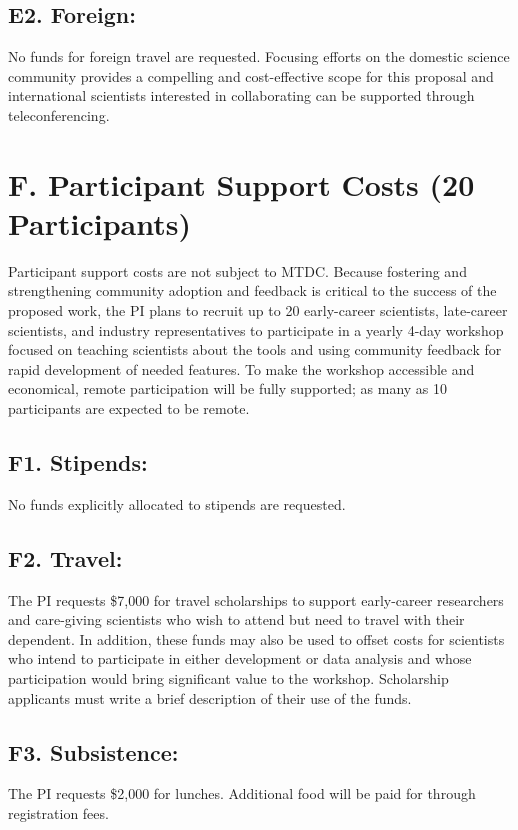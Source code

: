 \documentclass[11pt,oneside]{memoir}
\begin{document}
\subsection{E2. Foreign:}
No funds for foreign travel are requested.  Focusing efforts on the domestic science community provides a compelling and cost-effective scope for this proposal and international scientists interested in collaborating can be supported through teleconferencing.


\section*{F. Participant Support Costs (20 Participants)} 
Participant support costs are not subject to MTDC.  Because fostering and strengthening community adoption and feedback is critical to the success of the proposed work, the PI plans to recruit up to 20 early-career scientists, late-career scientists, and industry representatives to participate in a yearly 4-day workshop focused on teaching scientists about the tools and using community feedback for rapid development of needed features.  To make the workshop accessible and economical, remote participation will be fully supported; as many as 10 participants are expected to be remote.

\subsection*{F1. Stipends:}  
No funds explicitly allocated to stipends are requested.

\subsection*{F2. Travel:} 
The PI requests \$7,000 for travel scholarships to support early-career researchers and care-giving scientists who wish to attend but need to travel with their dependent.  In addition, these funds may also be used to offset costs for scientists who intend to participate in either development or data analysis and whose participation would bring significant value to the workshop.  Scholarship applicants must write a brief description of their use of the funds.

\subsection*{F3. Subsistence:}  The PI requests \$2,000 for lunches.  Additional food will be paid for through registration fees.
\end{document}
